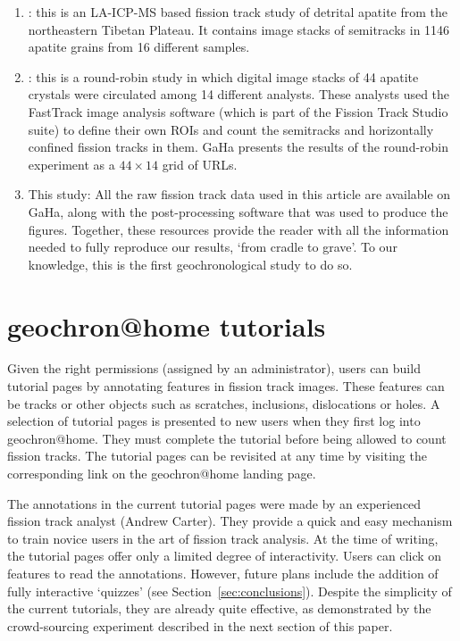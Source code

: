 \documentclass[gchron, manuscript]{copernicus}
\begin{document}
\begin{enumerate}
\item{\citet{guo2025}}: this is an LA-ICP-MS based fission track study
  of detrital apatite from the northeastern Tibetan Plateau. It
  contains image stacks of semitracks in 1146 apatite grains from 16
  different samples.
\item{\citet{tamer2025}}: this is a round-robin study in which digital
  image stacks of 44 apatite crystals were circulated among 14
  different analysts. These analysts used the FastTrack image analysis
  software (which is part of the Fission Track Studio suite) to define
  their own ROIs and count the semitracks and horizontally confined
  fission tracks in them. GaHa presents the results of the round-robin
  experiment as a ${44}\times{14}$ grid of URLs.
\item{This study}: All the raw fission track data used in this article
  are available on GaHa, along with the post-processing software that
  was used to produce the figures. Together, these resources provide
  the reader with all the information needed to fully reproduce our
  results, `from cradle to grave'. To our knowledge, this is the first
  geochronological study to do so.
\end{enumerate}

\section{geochron@home tutorials}\label{sec:tutorial}

Given the right permissions (assigned by an administrator), users can
build tutorial pages by annotating features in fission track images.
These features can be tracks or other objects such as scratches,
inclusions, dislocations or holes. A selection of tutorial pages is
presented to new users when they first log into
geochron@home. They must complete the tutorial before being
allowed to count fission tracks.  The tutorial pages can be revisited
at any time by visiting the corresponding link on the
geochron@home landing page.\medskip

The annotations in the current tutorial pages were made by an
experienced fission track analyst (Andrew Carter). They provide a
quick and easy mechanism to train novice users in the art of fission
track analysis. At the time of writing, the tutorial pages offer only
a limited degree of interactivity. Users can click on features to read
the annotations. However, future plans include the addition of fully
interactive `quizzes' (see Section~\ref{sec:conclusions}). Despite the
simplicity of the current tutorials, they are already quite effective,
as demonstrated by the crowd-sourcing experiment described in the next
section of this paper.
\end{document}
